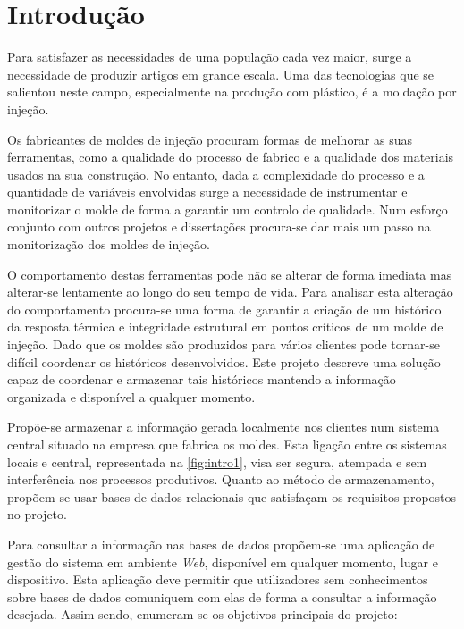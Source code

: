 \documentclass[11pt,twoside,a4paper]{report}
\begin{document}
\chapter{Introdução}
\label{chap:intro}
\vspace{-0.5cm}
Para satisfazer as necessidades de uma população cada vez maior, surge a necessidade de produzir artigos em grande escala. Uma das tecnologias que se salientou neste campo, especialmente na produção com plástico, é a moldação por injeção.\par
Os fabricantes de moldes de injeção procuram formas de melhorar as suas ferramentas, como a qualidade do processo de fabrico e a qualidade dos materiais usados na sua construção. No entanto, dada a complexidade do processo e a quantidade de variáveis envolvidas surge a necessidade de instrumentar e monitorizar o molde de forma a garantir um controlo de qualidade. Num esforço conjunto com outros projetos e dissertações
procura-se dar mais um passo na monitorização dos moldes de injeção.\par
O comportamento destas ferramentas pode não se alterar de forma imediata mas alterar-se lentamente ao longo do seu tempo de vida. Para analisar esta alteração do comportamento procura-se uma forma de garantir a criação de um histórico da resposta térmica e integridade estrutural em pontos críticos de um molde de injeção. Dado que os moldes são produzidos para vários clientes pode tornar-se difícil coordenar os históricos desenvolvidos. Este projeto descreve uma solução capaz de coordenar e armazenar tais históricos mantendo a informação organizada e disponível a qualquer momento.\par 
Propõe-se armazenar a informação gerada localmente nos clientes num sistema central situado na empresa que fabrica os moldes. Esta ligação entre os sistemas locais e central, representada na \autoref{fig:intro1}, visa ser segura, atempada e sem interferência nos processos produtivos. Quanto ao método de armazenamento, propõem-se usar bases de dados relacionais que satisfaçam os requisitos propostos no projeto.\par
Para consultar a informação nas bases de dados propõem-se uma aplicação de gestão do sistema em ambiente \textit{Web}, disponível em qualquer momento, lugar e dispositivo. Esta aplicação deve permitir que utilizadores sem conhecimentos sobre bases de dados comuniquem com elas de forma a consultar a informação desejada. Assim sendo, enumeram-se os objetivos principais do projeto:
\end{document}
